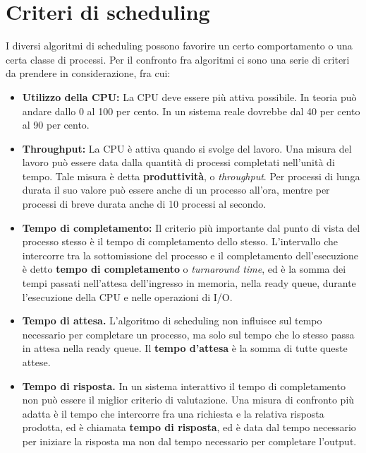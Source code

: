 \section{Criteri di scheduling}
    I diversi algoritmi di scheduling possono favorire un certo comportamento o una certa classe di processi. Per il confronto fra algoritmi ci sono una serie di criteri da prendere in considerazione, fra cui:
    \begin{itemize}
        \item \textbf{Utilizzo della CPU:} La CPU deve essere più attiva possibile. In teoria può andare dallo 0 al 100 per cento. In un sistema reale dovrebbe dal 40 per cento al 90 per cento.
        
        \item \textbf{Throughput:} La CPU è attiva quando si svolge del lavoro. Una misura del lavoro può essere data dalla quantità di processi completati nell'unità di tempo. Tale misura è detta \textbf{produttività}, o \textit{throughput}. Per processi di lunga durata il suo valore può essere anche di un processo all'ora, mentre per processi di breve durata anche di 10 processi al secondo.
        
        \item \textbf{Tempo di completamento:} Il criterio più importante dal punto di vista del processo stesso è il tempo di completamento dello stesso. L'intervallo che intercorre tra la sottomissione del processo e il completamento dell'esecuzione è detto \textbf{tempo di completamento} o \textit{turnaround time}, ed è la somma dei tempi passati nell'attesa dell'ingresso in memoria, nella ready queue, durante l'esecuzione della CPU e nelle operazioni di I/O.
        
        \item \textbf{Tempo di attesa.} L'algoritmo di scheduling non influisce sul tempo necessario per completare un processo, ma solo sul tempo che lo stesso passa in attesa nella ready queue. Il \textbf{tempo d'attesa} è la somma di tutte queste attese.
        
        \item \textbf{Tempo di risposta.} In un sistema interattivo il tempo di completamento non può essere il miglior criterio di valutazione. Una misura di confronto più adatta è il tempo che intercorre fra una richiesta e la relativa risposta prodotta, ed è chiamata \textbf{tempo di risposta}, ed è data dal tempo necessario per iniziare la risposta ma non dal tempo necessario per completare l'output.
    \end{itemize}
    
